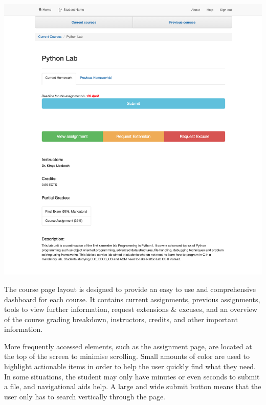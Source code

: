 \includegraphics[width=\textwidth]{screenshots/PythonLab.png}

The course page layout is designed to provide an easy to use and comprehensive dashboard for each course. It contains current assignments, previous assignments, tools to view further information, request extensions \& excuses, and an overview of the course grading breakdown, instructors, credits, and other important information. 

More frequently accessed elements, such as the assignment page, are located at the top of the screen to minimise scrolling. Small amounts of color are used to highlight actionable items in order to help the user quickly find what they need. In some situations, the student may only have minutes or even seconds to submit a file, and navigational aids help. A large and wide submit button means that the user only has to search vertically through the page.